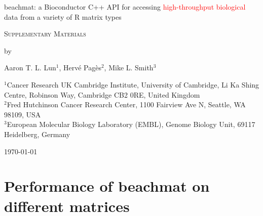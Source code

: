 \documentclass{article}
\newcommand{\revised}[1]{\textcolor{red}{#1}}
\begin{document}
\begin{titlepage}
\vspace*{3cm}
\begin{center}


{\Large
beachmat: a Bioconductor C++ API for accessing \revised{high-throughput biological} data from a variety of R matrix types
\par}

\vspace{0.75cm}

{\Large
    \textsc{Supplementary Materials}
\par
}
\vspace{0.75cm}

\large
by


\vspace{0.75cm}
Aaron T. L. Lun$^1$,
Herv\'e Pag\`es$^2$,
Mike L. Smith$^3$

\vspace{1cm}
\begin{minipage}{0.9\textwidth}
\begin{flushleft}
$^1$Cancer Research UK Cambridge Institute, University of Cambridge, Li Ka Shing Centre, Robinson Way, Cambridge CB2 0RE, United Kingdom \\[6pt]
$^2$Fred Hutchinson Cancer Research Center, 1100 Fairview Ave N, Seattle, WA 98109, USA \\[6pt]
$^3$European Molecular Biology Laboratory (EMBL), Genome Biology Unit, 69117 Heidelberg, Germany \\[6pt]
\end{flushleft}
\end{minipage}

\vspace{1.5cm}
{\large \today{}}

\vspace*{\fill}
\end{center}
\end{titlepage}

\providecommand{\myceil}[1]{\left \lceil #1 \right \rceil }

\section{Performance of beachmat on different matrices}
\end{document}
